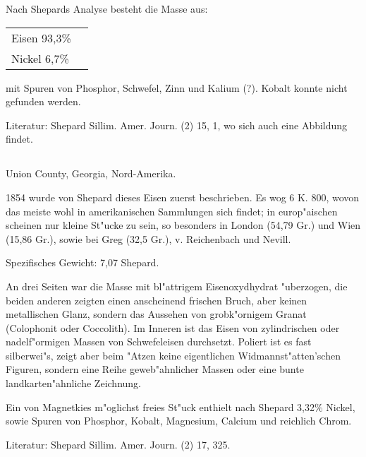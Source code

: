 \documentclass[a4paper, 11pt, oneside]{article}
\begin{document}
Nach Shepards Analyse besteht die Masse aus:
\begin{table}[H]
    \centering\swabfamily\Large
    \begin{tabular}{l l}
        Eisen 93,3\% \\
        Nickel 6,7\% \\
    \end{tabular}
\end{table}

mit Spuren von Phosphor, Schwefel, Zinn und Kalium (?). Kobalt konnte nicht gefunden werden.

\normalsize
Literatur: Shepard Sillim. Amer. Journ. (2) 15, 1, wo sich auch eine Abbildung findet.

\subsection{}
\LARGE
\paragraph{}
Union County, Georgia, Nord-Amerika.

1854 wurde von Shepard dieses Eisen zuerst beschrieben. Es wog 6 K. 800, wovon das meiste wohl in amerikanischen Sammlungen sich findet; in europ"aischen scheinen nur kleine St"ucke zu sein, so besonders in London (54,79 Gr.) und Wien (15,86 Gr.), sowie bei Greg (32,5 Gr.), v. Reichenbach und Nevill.

Spezifisches Gewicht: 7,07 Shepard.

An drei Seiten war die Masse mit bl"attrigem Eisenoxydhydrat "uberzogen, die beiden anderen zeigten einen anscheinend frischen Bruch, aber keinen metallischen Glanz, sondern das Aussehen von grobk"ornigem Granat (Colophonit oder Coccolith). Im Inneren ist das Eisen von zylindrischen oder nadelf"ormigen Massen von Schwefeleisen durchsetzt. Poliert ist es fast silberwei"s, zeigt aber beim "Atzen keine eigentlichen Widmannst"atten'schen Figuren, sondern eine Reihe geweb"ahnlicher Massen oder eine bunte landkarten"ahnliche Zeichnung.

Ein von Magnetkies m"oglichst freies St"uck enthielt nach Shepard 3,32\% Nickel, sowie Spuren von Phosphor, Kobalt, Magnesium, Calcium und reichlich Chrom.

\normalsize
Literatur: Shepard Sillim. Amer. Journ. (2) 17, 325.

\subsection{}
\LARGE
\end{document}
